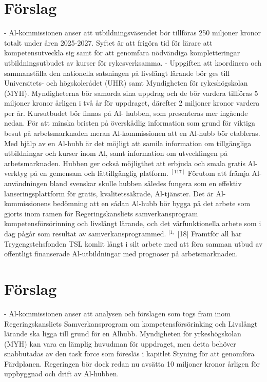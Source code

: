 {{{{{{{{{{{{\section*{Förslag}
- Al-kommissionen anser att utbildningsväsendet bör tillföras 250 miljoner kronor totalt under åren 2025-2027. Syftet är att frigöra tid för lärare att kompetensutveckla sig samt för att genomfara nödvändiga kompletteringar utbildningsutbudet av kurser för rykesverksamma.
- Uppgiften att koordinera och sammanställa den nationella satsningen på livslängt lärande bör ges till Universitets- och högskolerådet (UHR) samt Myndigheten för rykeshögskolan (MYH). Myndigheterna bör samorda sina uppdrag och
de bör vardera tillföras 5 miljoner kronor årligen i två år för uppdraget, därefter 2 miljoner kronor vardera per år. Kursutbudet bör finnas på Al- hubben, som presenteras mer ingående nedan.
För att minska bristen på överskådlig information som grund för viktiga besut på arbetsmarknaden meran Al-kommissionen att en Al-hubb bör etableras. Med hjälp av en Al-hubb är det möjligt att samila information om tillgängliga utbildningar och kurser inom Al, samt information om utvecklingen på arbetsmarknaden. Hubben ger också möjligthet att erbjuda och smala gratis Al-verktyg på en gemensam och lättillgänglig platform. \({ }^{[117]}\) Förutom att främja Al-användningen bland svenskar skulle hubben således fungera som en effektiv lanseringsplattform för gratis, kvalitetssäkrade, Al-tjänster.
Det är Al-kommissionens bedömning att en sådan Al-hubb bör bygga på det arbete som gjorts inom ramen för Regeringskansliets samverkansprogram kompetensförsörinning och livslängt lärande, och det värfunktionella arbete som i dag pågår som resultat av samverkansprogrammed. \({ }^{[1,}\) [18] Framtför all har Trygengstehsfonden TSL komlit långt i silt arbete med att föra samman utbud av offentligt finanserade Al-utbildningar med prognoser på arbetsmarknaden.
\section*{Förslag}
- Al-kommissionen anser att analysen och förslagen som togs fram inom Regeringskansliets Samverkansprogram om kompetensförsörinking och Livslångt lärande ska ligga till grund för en Alhubb. Myndigheten för yrkeshögskolan (MYH) kan vara en lämplig huvudman för uppdraget, men detta behöver snabbutadas av den task force som föresläs i kapitlet Styning för att genomföra Färdplanen. Regeringen bör dock redan nu avsätta 10 miljoner kronor årligen för uppbyggnad och drift av Al-hubben.
}}}}}}}}}}}}
